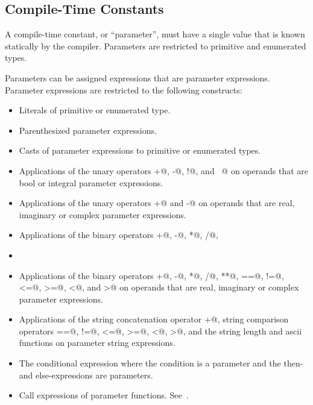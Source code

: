 \subsection{Compile-Time Constants}
\label{Compile-Time_Constants}

A compile-time constant, or ``parameter'', must have a single value that is
known statically by the compiler.  Parameters are restricted to
primitive and enumerated types.

Parameters can be assigned expressions that are parameter expressions.
Parameter expressions are restricted to the following constructs:
\begin{itemize}
\item
 Literals of primitive or enumerated type.
\item
 Parenthesized parameter expressions.
\item
 Casts of parameter expressions to primitive or enumerated types.
\item
 Applications of the unary operators \verb@+@, \verb@-@, \verb@!@,
 and \verb@~@ on operands that are bool or integral parameter
 expressions.
\item
 Applications of the unary operators \verb@+@ and \verb@-@ on operands that are
 real, imaginary or complex parameter
 expressions.
\item
 Applications of the binary operators \verb@+@, \verb@-@, \verb@*@, \verb@/@, \verb@%@, \verb@**@, \verb@&&@, \verb@||@, \verb@&@, \verb@|@, \verb@^@, \verb@<<@, \verb@>>@, \verb@==@, \verb@!=@, \verb@<=@, \verb@>=@, \verb@<@, and \verb@>@ on operands that are bool or integral parameter expressions.
\item
\item
 Applications of the binary
 operators \verb@+@, \verb@-@, \verb@*@, \verb@/@, \verb@**@, \verb@==@, \verb@!=@, \verb@<=@, \verb@>=@, \verb@<@,
 and \verb@>@ on operands that are real, imaginary or complex parameter expressions.
\item
 Applications of the string concatenation operator \verb@+@, string comparison operators \verb@==@, \verb@!=@, \verb@<=@, \verb@>=@, \verb@<@, \verb@>@, and the string length and ascii functions on parameter string expressions.
\item
 The conditional expression where the condition is a parameter and the
 then- and else-expressions are parameters.
\item
 Call expressions of parameter functions.  See~.
\end{itemize}

